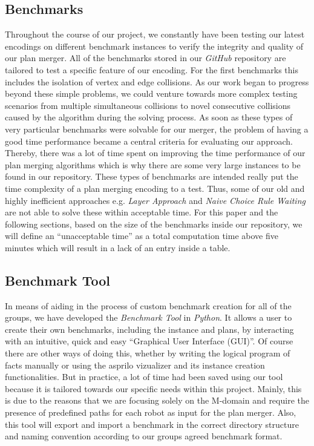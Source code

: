 \documentclass{llncs}
\begin{document}
\subsection{Benchmarks}
Throughout the course of our project, we constantly have been testing our latest encodings on different benchmark instances to verify the integrity and quality of our plan merger. All of the benchmarks stored in our \emph{GitHub} repository \cite{project1} are tailored to test a specific feature of our encoding. For the first benchmarks this includes the isolation of vertex and edge collisions. As our work began to progress beyond these simple problems, we could venture towards more complex testing scenarios from multiple simultaneous collisions to novel consecutive collisions caused by the algorithm during the solving process. As soon as these types of very particular benchmarks were solvable for our merger, the problem of having a good time performance became a central criteria for evaluating our approach. Thereby, there was a lot of time spent on improving the time performance of our plan merging algorithms which is why there are some very large instances to be found in our repository. These types of benchmarks are intended really put the time complexity of a plan merging encoding to a test. Thus, some of our old and highly inefficient approaches e.g. \emph{Layer Approach} and \emph{Naive Choice Rule Waiting} are not able to solve these within acceptable time.
For this paper and the following sections, based on the size of the benchmarks inside our repository, we will define an ``unacceptable time'' as a total computation time above five minutes which will result in a lack of an entry inside a table.



\subsection{Benchmark Tool}
In means of aiding in the process of custom benchmark creation for all of the groups, we have developed the \emph{Benchmark Tool}\cite{project1} in \emph{Python}. It allows a user to create their own benchmarks, including the instance and plans, by interacting with an intuitive, quick and easy ``Graphical User Interface (GUI)''. Of course there are other ways of doing this, whether by writing the logical program of facts manually or using the asprilo vizualizer and its instance creation functionalities. But in practice, a lot of time had been saved using our tool because it is tailored towards our specific needs within this project. Mainly, this is due to the reasons that we are focusing solely on the M-domain and require the presence of predefined paths for each robot as input for the plan merger. Also, this tool will export and import a benchmark in the correct directory structure and naming convention according to our groups agreed benchmark format.
\end{document}
